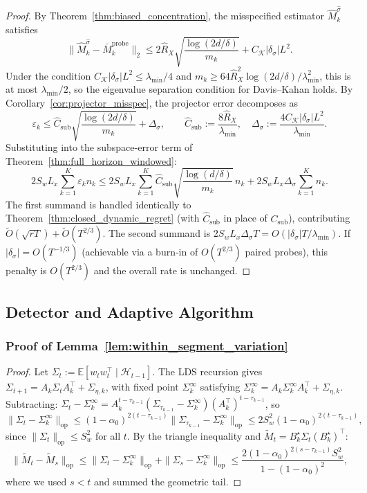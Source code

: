\documentclass{article}
\newcommand{\E}{\mathbb{E}}
\newcommand{\op}{\mathrm{op}}
\newcommand{\cH}{\mathcal{H}}
\begin{document}
\begin{proof}
By Theorem~\ref{thm:biased_concentration}, the misspecified estimator $\widehat M_k^{\hat\sigma}$ satisfies
\[
\|\widehat M_k^{\hat\sigma} - \bar M_k^{\mathrm{probe}}\|_2 \le 2\hat R_X\sqrt{\frac{\log(2d/\delta)}{m_k}} + C_{\mathcal K}|\delta_\sigma|L^2.
\]
Under the condition $C_{\mathcal K}|\delta_\sigma|L^2 \le \lambda_{\min}/4$ and $m_k \ge 64\hat R_X^2\log(2d/\delta)/\lambda_{\min}^2$, this is at most $\lambda_{\min}/2$, so the eigenvalue separation condition for Davis--Kahan holds.
By Corollary~\ref{cor:projector_misspec}, the projector error decomposes as
\[
\varepsilon_k \le \hat C_{\mathrm{sub}}\sqrt{\frac{\log(2d/\delta)}{m_k}} + \Delta_\sigma, \qquad \hat C_{\mathrm{sub}} := \frac{8\hat R_X}{\lambda_{\min}}, \quad \Delta_\sigma := \frac{4C_{\mathcal K}|\delta_\sigma|L^2}{\lambda_{\min}}.
\]
Substituting into the subspace-error term of Theorem~\ref{thm:full_horizon_windowed}:
\[
2S_wL_x\sum_{k=1}^K\varepsilon_k n_k \le 2S_wL_x\sum_{k=1}^K \hat C_{\mathrm{sub}}\sqrt{\frac{\log(d/\delta)}{m_k}}\,n_k + 2S_wL_x\Delta_\sigma \sum_{k=1}^K n_k.
\]
The first summand is handled identically to Theorem~\ref{thm:closed_dynamic_regret} (with $\hat C_{\mathrm{sub}}$ in place of $C_{\mathrm{sub}}$), contributing $\widetilde O(\sqrt{rT}) + \widetilde O(T^{2/3})$.
The second summand is $2S_wL_x\Delta_\sigma T = O(|\delta_\sigma|T/\lambda_{\min})$.
If $|\delta_\sigma| = O(T^{-1/3})$ (achievable via a burn-in of $O(T^{2/3})$ paired probes), this penalty is $O(T^{2/3})$ and the overall rate is unchanged.
\end{proof}

\subsection{Detector and Adaptive Algorithm}

\subsubsection{Proof of Lemma~\ref{lem:within_segment_variation}}
\label{proof:within_segment_variation}

\begin{proof}
Let $\Sigma_t := \E[w_t w_t^\top \mid \cH_{t-1}]$.
The LDS recursion gives $\Sigma_{t+1} = A_k \Sigma_t A_k^\top + \Sigma_{\eta,k}$, with fixed point $\Sigma_k^\infty$ satisfying $\Sigma_k^\infty = A_k \Sigma_k^\infty A_k^\top + \Sigma_{\eta,k}$.
Subtracting: $\Sigma_t - \Sigma_k^\infty = A_k^{t-\tau_{k-1}}(\Sigma_{\tau_{k-1}} - \Sigma_k^\infty)(A_k^\top)^{t-\tau_{k-1}}$, so
\[
\|\Sigma_t - \Sigma_k^\infty\|_{\op} \le (1-\alpha_0)^{2(t-\tau_{k-1})}\|\Sigma_{\tau_{k-1}} - \Sigma_k^\infty\|_{\op} \le 2S_w^2(1-\alpha_0)^{2(t-\tau_{k-1})},
\]
since $\|\Sigma_t\|_{\op} \le S_w^2$ for all $t$.
By the triangle inequality and $\widetilde M_t = B_k^\star \Sigma_t (B_k^\star)^\top$:
\[
\|\widetilde M_t - \widetilde M_s\|_{\op} \le \|\Sigma_t - \Sigma_k^\infty\|_{\op} + \|\Sigma_s - \Sigma_k^\infty\|_{\op} \le \frac{2(1-\alpha_0)^{2(s-\tau_{k-1})} S_w^2}{1-(1-\alpha_0)^2},
\]
where we used $s < t$ and summed the geometric tail.
\end{proof}
\end{document}
